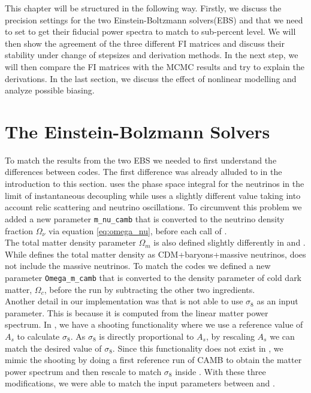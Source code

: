 \documentclass[../main.tex]{subfiles}
\begin{document}
This chapter will be structured in the following way. Firstly, we discuss the precision settings for the two Einstein-Boltzmann solvers(EBS) \camb and \class that we need to set to get their fiducial power spectra to match to sub-percent level. We will then show the agreement of the three different FI matrices and discuss their stability under change of stepsizes and derivation methods. In the next step, we will then compare the FI matrices with the MCMC results and try to explain the derivations. In the last section, we discuss the effect of nonlinear modelling and analyze possible biasing.
\section{The Einstein-Bolzmann Solvers}
To match the results from the two EBS we needed to first understand the differences between codes. The first difference was already alluded to in the introduction to this section. \camb uses the phase space integral for the neutrinos in the limit of instantaneous decoupling while \class uses a slightly different value taking into account relic scattering and neutrino oscillations. To circumvent this problem we added a new parameter {\tt m\_nu\_camb} that is converted to the neutrino density fraction $\Omega_\nu$ via equation \ref{eq:omega_nu}, before each call of \class .\\
The total matter density parameter $\Omega_m$ is also defined slightly differently in \camb and \class. While \camb defines the total matter density as CDM+baryons+massive neutrinos, \class does not include the massive neutrinos. To match the codes we defined a new parameter {\tt Omega\_m\_camb} that is converted to the density parameter of cold dark matter, $\Omega_{c}$, before the run by subtracting the other two ingredients.\\
Another detail in our implementation was that \camb is not able to use $\sigma_8$ as an input parameter. This is because it is computed from the linear matter power spectrum. In \class, we have a shooting functionality where we use a reference value of $A_s$ to calculate $\sigma_8$. As $\sigma_8$ is directly proportional to $A_s$, by rescaling $A_s$ we can match the desired value of $\sigma_8$. Since this functionality does not exist in \camb, we mimic the shooting by doing a first reference run of CAMB to obtain the matter power spectrum and then rescale to match $\sigma_8$ inside \cosmicfish. With these three modifications, we were able to match the input parameters between \class and \camb.\\
\end{document}
